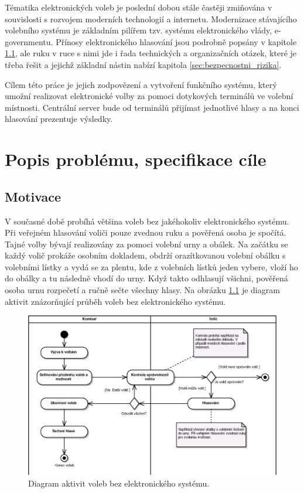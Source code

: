 \documentclass[11pt,twoside,a4paper]{book}
\begin{document}
Tématika elektronických voleb je poslední dobou stále častěji zmiňována v souvislosti s rozvojem moderních technologií a internetu. Modernizace stávajícího volebního systému je základním pilířem tzv. systému elektronického vlády, e-governmentu. Přínosy elektronického hlasování jsou podrobně popsány v kapitole \ref{sec:motivace}, ale ruku v ruce s nimi jde i řada technických a organizačních otázek, které je třeba řešit a jejichž základní nástin nabízí kapitola \ref{sec:bezpecnostni_rizika}.

Cílem této práce je jejich zodpovězení a vytvoření funkčního systému, který umožní realizovat elektronické volby za pomoci dotykových terminálů ve volební místnosti. Centrální server bude od terminálů přijímat jednotlivé hlasy a na konci hlasování prezentuje výsledky.


\chapter{Popis problému, specifikace cíle}

\section{Motivace} \label{sec:motivace}

V současné době probíhá většina voleb bez jakéhokoliv elektronického systému. Při veřejném hlasování voliči pouze zvednou ruku a pověřená osoba je spočítá. Tajné volby bývají realizovány za pomoci volební urny a obálek. Na začátku se každý volič prokáže osobním dokladem, obdrží orazítkovanou volební obálku s volebními lístky a vydá se za plentu, kde z volebních lístků jeden vybere, vloží ho do obálky a tu následně vhodí do urny. Když takto odhlasují všichni, pověřená osoba urnu rozpečetí a ručně sečte všechny hlasy. Na obrázku \ref{fig:soucasny_stav} je diagram aktivit znázorňující průběh voleb bez elektronického systému.

\begin{figure}[h]
	\centering
	\includegraphics[scale=0.9]{diagrams/soucasny_stav.eps}
	\caption{Diagram aktivit voleb bez elektronického systému.}
	\label{fig:soucasny_stav}
\end{figure}
\end{document}
